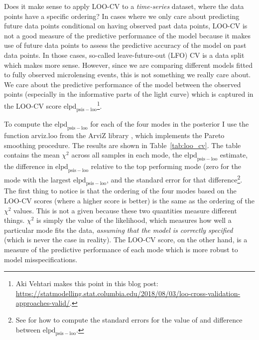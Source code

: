 \documentclass[12pt,dvipsnames]{report}
\newcommand{\ssf}[1]{\textsf{#1}}
\begin{document}
Does it make sense to apply LOO-CV to a \emph{time-series} dataset, where 
the data points have a specific ordering? In cases where we only care about 
predicting future data points conditional on having observed past data points, 
LOO-CV is not a good measure of the predictive performance of the model because it 
makes use of future data points to assess the predictive accuracy of the model on past data points. 
In those cases, so-called leave-future-out (LFO) CV \citep{arXiv:1902.06281} is a data split which 
makes more sense.
However, since we are comparing different models fitted to fully observed microlensing events, 
this is not something we really care about. We care about the predictive performance 
of the model between the observed points  (especially in the informative 
parts of the light curve) which is captured in the LOO-CV score 
$\mathrm{elpd}_\mathrm{psis-loo}$\footnote{Aki Vehtari makes this point in this blog post: 
\url{https://statmodelling.stat.columbia.edu/2018/08/03/loo-cross-validation-approaches-valid/}.}.

 To compute the $\mathrm{elpd}_\mathrm{psis-loo}$ for each of the four modes 
 in the posterior I use the function \ssf{arviz.loo} from the \ssf{ArviZ} library 
 \citep{arviz_2019}, which implements the Pareto smoothing procedure.  
 The results are shown in Table~\ref{tab:loo_cv}. The table contains the mean 
 $\chi^2$ across all samples in each mode, the $\mathrm{elpd}_\mathrm{psis-loo}$ estimate, the difference 
in $\mathrm{elpd}_\mathrm{psis-loo}$ relative to the top performing mode (zero
for the mode with the largest $\mathrm{elpd}_\mathrm{psis-loo}$, and the 
standard error for that difference\footnote{See \citet{vehtari2017} for how to compute
the standard errors for the value of and difference between 
$\mathrm{elpd}_\mathrm{psis-loo}$.}.  
The first thing to notice is that the ordering of the four modes based on the LOO-CV scores 
(where a higher score is better) is the same as the ordering of the $\chi^2$ values. 
This is not a given because these two quantities measure different things. 
$\chi^2$ is simply the value of the likelihood, 
which measures how well a particular mode fits the data, \emph{assuming that the model is 
correctly specified} (which is never the case in reality).
The LOO-CV score, on the other hand, is a measure of the predictive performance of each 
mode which is more robust to model misspecifications. 
\end{document}
